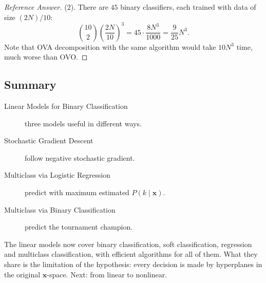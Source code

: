 \begin{proof}[Reference Answer]
    (2). There are \(45\) binary classifiers, each trained with data of size
    \((2N)/10\):
    \[
        \binom{10}{2} \left( \frac{2N}{10} \right)^3 = 45 \cdot
        \frac{8 N^3}{1000} = \frac{9}{25} N^3 .
    \]
    Note that OVA decomposition with the same algorithm would take \(10
    N^3\) time, much worse than OVO.
\end{proof}

\hrulebar

\subsection*{Summary}

\begin{description}
    \item[Linear Models for Binary Classification] three models useful in
        different ways.
    \item[Stochastic Gradient Descent] follow negative stochastic gradient.
    \item[Multiclass via Logistic Regression] predict with maximum estimated
        \(P(k \mid \bm{x})\).
    \item[Multiclass via Binary Classification] predict the tournament
        champion.
\end{description}

The linear models now cover binary classification, soft classification,
regression and multiclass classification, with efficient algorithms for all of
them. What they share is the limitation of the hypothesis: every decision is
made by hyperplanes in the original \(\bm{x}\)-space. Next: from linear to
nonlinear.
